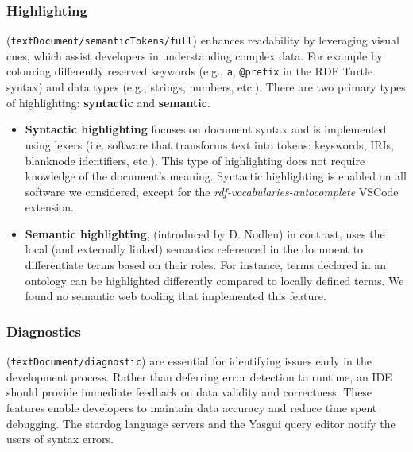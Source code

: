 \subsubsection{Highlighting} (\texttt{textDocument/semanticTokens/full}) enhances readability by leveraging visual cues, which assist developers in understanding complex data.
For example by colouring differently reserved keywords (e.g., \texttt{a}, \texttt{@prefix} in the RDF Turtle syntax) and data types (e.g., strings, numbers, etc.).  
There are two primary types of highlighting: \textbf{syntactic} and \textbf{semantic}.

\begin{itemize}
    \item \textbf{Syntactic highlighting} focuses on document syntax and is implemented using lexers (i.e. software that transforms text into tokens: keyswords, IRIs, blanknode identifiers, etc.).
      This type of highlighting does not require knowledge of the document's meaning.
      Syntactic highlighting is enabled on all software we considered, except for the 
      \textit{rdf-vocabularies-autocomplete} VSCode extension.
    \item \textbf{Semantic highlighting}, (introduced by D. Nodlen\cite{DNolden}) in contrast, uses the local (and externally linked) semantics referenced in the document to differentiate terms based on their roles. 
      For instance, terms declared in an ontology can be highlighted differently compared to locally defined terms.
      We found no semantic web tooling that implemented this feature.
\end{itemize}


\subsubsection{Diagnostics} (\texttt{textDocument/diagnostic}) are essential for identifying issues early in the development process. 
Rather than deferring error detection to runtime, an IDE should provide immediate feedback on data validity and correctness.
These features enable developers to maintain data accuracy and reduce time spent debugging. 
The stardog language servers and the Yasgui query editor notify the users of syntax errors.

